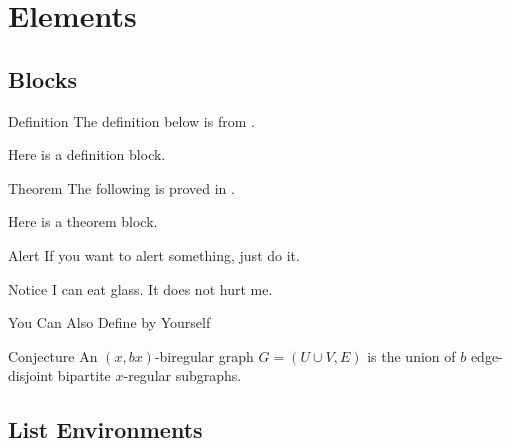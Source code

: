 
\section{Elements}

\subsection{Blocks}

\begin{frame}{Definition}
	The definition below is from \cite{angluin1980local}.

	\begin{definition}
		Here is a definition block.
	\end{definition}
\end{frame}

\begin{frame}{Theorem}
	The following is proved in \cite[pp.~74--75]{yamashita1996computing1}.

	\begin{theorem}
		Here is a theorem block.
	\end{theorem}
\end{frame}

\begin{frame}{Alert}
	If you want to alert something, \alert{just do it}.

	\begin{alertblock}{Notice}
		I can eat glass. It does not hurt me.
	\end{alertblock}
\end{frame}

\begin{frame}{You Can Also Define by Yourself}
	\begin{block}{Conjecture}
		An \((x, bx)\)-biregular graph \(G = (U \cup V, E)\) is the union of \(b\) edge-disjoint bipartite \(x\)-regular subgraphs.
	\end{block}
\end{frame}

\subsection{List Environments}

